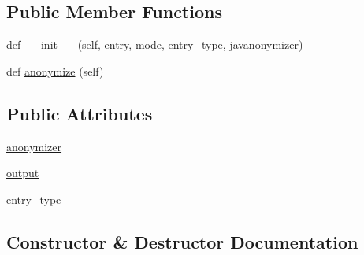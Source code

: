\subsection*{Public Member Functions}
\begin{DoxyCompactItemize}
\item 
def \hyperlink{classparlai_1_1utils_1_1anonymizer_1_1MemoriesAnonymizer_a47fd1757c0382cd65aea78543aabb247}{\+\_\+\+\_\+init\+\_\+\+\_\+} (self, \hyperlink{classparlai_1_1utils_1_1anonymizer_1_1Anonymizer_a348d1fd062fa3f57ad81cce32e8dd2c7}{entry}, \hyperlink{classparlai_1_1utils_1_1anonymizer_1_1Anonymizer_a535b959cd821885d5af2831644cde735}{mode}, \hyperlink{classparlai_1_1utils_1_1anonymizer_1_1MemoriesAnonymizer_ace27f68e5f31c8b07a62a8dc781bca59}{entry\+\_\+type}, javanonymizer)
\item 
def \hyperlink{classparlai_1_1utils_1_1anonymizer_1_1MemoriesAnonymizer_ac22260ce2e76207a6b72122c7fb0ba00}{anonymize} (self)
\end{DoxyCompactItemize}
\subsection*{Public Attributes}
\begin{DoxyCompactItemize}
\item 
\hyperlink{classparlai_1_1utils_1_1anonymizer_1_1MemoriesAnonymizer_ab8ae572f757ec11ee806e95c707ac1ea}{anonymizer}
\item 
\hyperlink{classparlai_1_1utils_1_1anonymizer_1_1MemoriesAnonymizer_abfbdf36b25476c6aa1a90e4faf43e6f3}{output}
\item 
\hyperlink{classparlai_1_1utils_1_1anonymizer_1_1MemoriesAnonymizer_ace27f68e5f31c8b07a62a8dc781bca59}{entry\+\_\+type}
\end{DoxyCompactItemize}


\subsection{Constructor \& Destructor Documentation}
\mbox{\label{classparlai_1_1utils_1_1anonymizer_1_1MemoriesAnonymizer_a47fd1757c0382cd65aea78543aabb247}} 
